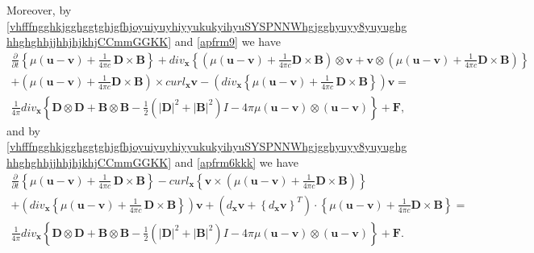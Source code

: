 \documentclass{article}
\theoremstyle{definition}
\theoremstyle{remark}
\renewcommand{\vec}[1]{\mathbf{#1}}
\newcommand{\er}{\eqref}
\newcommand{\er}{\eqref}
\begin{document}
Moreover, by
\er{vhfffngghkjgghggtghjgfhjoyuiyuyhiyyukukyihyuSYSPNNWhgjgghyuyy8yuyughghhghghhjjhhjhjkhjCCmmGGKK}
and \er{apfrm9} we have
\begin{multline}\label{vhfffngghkjgghggtghjgfhjoyuiyuyhiyyukukyihyuSYSPNNWhgjgghyuyy8yuyughghhghghhjjhhjhjkhjCCmmGGKKJJKK}
\frac{\partial}{\partial t}\left\{ \mu \left(\vec u-\vec v\right)
+\frac{1}{4\pi c}\,\vec D\times \vec B\right\}+ div_{\vec
x}\left\{\left(\mu \left(\vec u-\vec v\right)+\frac{1}{4\pi c}\vec
D\times \vec B\right)\otimes \vec v+\vec v\otimes\left(\mu\left(\vec
u-\vec v\right)+\frac{1}{4\pi c}\vec D\times \vec B\right)\right\}
\\+\left(\mu\left(\vec u-\vec v\right)
+\frac{1}{4\pi c}\vec D\times \vec B\right)\times curl_{\vec x}\vec
v-\left(div_{\vec x}\left\{\mu \left(\vec u-\vec v\right)
+\frac{1}{4\pi c}\,\vec D\times \vec B\right\}\right)\vec v=\\
\frac{1}{4\pi}div_\vec x\left\{\vec D\otimes \vec D+\vec B\otimes
\vec B-\frac{1}{2}\left(|\vec D|^2+|\vec B|^2\right)I-4\pi\mu
\left(\vec u-\vec v\right)\otimes(\vec u-\vec v)\right\}+\vec F,
\end{multline}
and by
\er{vhfffngghkjgghggtghjgfhjoyuiyuyhiyyukukyihyuSYSPNNWhgjgghyuyy8yuyughghhghghhjjhhjhjkhjCCmmGGKK}
and \er{apfrm6kkk} we have
\begin{multline}\label{vhfffngghkjgghggtghjgfhjoyuiyuyhiyyukukyihyuSYSPNNWhgjgghyuyy8yuyughghhghghhjjhhjhjkhjCCmmGGKKJJKKMod}
\frac{\partial}{\partial t}\left\{ \mu \left(\vec u-\vec v\right)
+\frac{1}{4\pi c}\,\vec D\times \vec B\right\}- curl_{\vec
x}\left\{\vec v\times\left(\mu\left(\vec u-\vec
v\right)+\frac{1}{4\pi c}\vec D\times \vec B\right)\right\}
\\+\left(div_{\vec x}\left\{\mu \left(\vec u-\vec v\right)
+\frac{1}{4\pi c}\,\vec D\times \vec B\right\}\right)\vec
v+\left(d_{\vec x}\vec v+\left\{d_{\vec x}\vec
v\right\}^T\right)\cdot\left\{\mu\left(\vec u-\vec v\right)
+\frac{1}{4\pi c}\vec D\times \vec B\right\}=\\
\frac{1}{4\pi}div_\vec x\left\{\vec D\otimes \vec D+\vec B\otimes
\vec B-\frac{1}{2}\left(|\vec D|^2+|\vec B|^2\right)I-4\pi\mu
\left(\vec u-\vec v\right)\otimes(\vec u-\vec v)\right\}+\vec F.
\end{multline}
\end{document}
